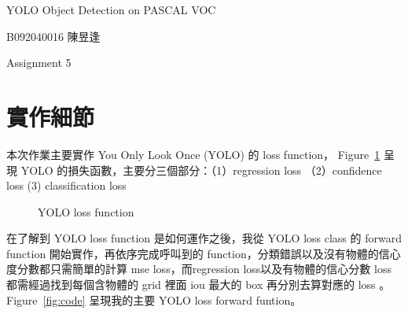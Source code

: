 \documentclass[a4paper,12pt]{article}   %
\begin{document}

\begin{center}
	{\fontsize{16pt}{12pt}\selectfont YOLO Object Detection on PASCAL VOC}
	
\end{center}

\hfill  B092040016 陳昱逢
	
	
\begin{center}
	Assignment 5
\end{center}

\section{實作細節}
	本次作業主要實作 You Only Look Once (YOLO) 的 loss function， Figure\ \ref{fig:loss} 呈現 YOLO 的損失函數，主要分三個部分：（1）regression loss （2）confidence loss (3) classification loss
	
	
	
\begin{figure}[htb]
  \vspace{0.1\baselineskip}  
  \centering  
    \caption{YOLO loss function}
    \label{fig:loss}
  \vspace{0.1\baselineskip}
\end{figure}


在了解到 YOLO loss function 是如何運作之後，我從 YOLO loss class 的 forward function 開始實作，再依序完成呼叫到的 function，分類錯誤以及沒有物體的信心度分數都只需簡單的計算 mse loss，而regression loss以及有物體的信心分數 loss 都需經過找到每個含物體的 grid 裡面 iou 最大的 box 再分別去算對應的 loss 。 Figure\ \ref{fig:code} 呈現我的主要 YOLO loss forward funtion。
\end{document}
